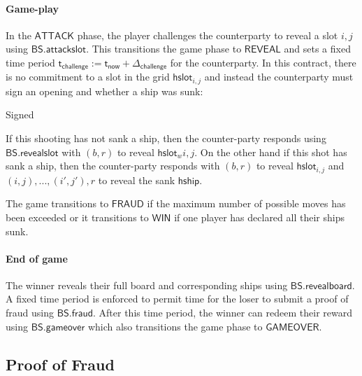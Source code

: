 \documentclass{llncs}
\newcommand{\instantiatedno}{\mathsf{NO}}
\newcommand{\instantiatedyes}{\mathsf{YES}}
\newcommand{\gameattack}{\mathsf{ATTACK}}
\newcommand{\gamereveal}{\mathsf{REVEAL}}
\newcommand{\gamewinner}{\mathsf{WIN}}
\newcommand{\gamefraud}{\mathsf{FRAUD}}
\newcommand{\gamefinished}{\mathsf{GAMEOVER}}
\newcommand{\hslot}{\mathsf{hslot}}
\newcommand{\hship}{\mathsf{hship}}
\newcommand{\hshiplocation}{\mathsf{hshiplocation}}
\newcommand{\participant}{\mathcal{P}}
\newcommand{\sign}{\mathsf{Sign}}
\newcommand{\battleshipfraud}{\mathsf{BS.fraud}}
\newcommand{\battleshipattackslot}{\mathsf{BS.attackslot}}
\newcommand{\battleshiprevealslot}{\mathsf{BS.revealslot}}
\newcommand{\battleshiprevealboard}{\mathsf{BS.revealboard}}
\newcommand{\battleshipgameover}{\mathsf{BS.gameover}}
\newcommand{\appcontract}{\mathsf{AC}}
\newcommand{\timerchallenge}{\mathsf{\Delta}_{\mathsf{challenge}}}
\newcommand{\timechallenge}{\mathsf{t}_{\mathsf{challenge}}}
\newcommand{\timenow}{\mathsf{t}_{\mathsf{now}}}
\begin{document}
\paragraph{Game-play} \label{sec:gameplay}

In the $\gameattack$ phase, the player challenges the counterparty to reveal a slot $i,j$ using $\battleshipattackslot$.
This transitions the game phase to $\gamereveal$ and sets a fixed time period $\timechallenge := \timenow + \timerchallenge$ for the counterparty.
In this contract, there is no commitment to a slot in the grid $\hslot_{i,j}$ and instead the counterparty must sign an opening and whether a ship was sunk: 

\begin{center}
	Signed
\end{center}

If this shooting has not sank a ship, then the counter-party responds using $\battleshiprevealslot$ with $(b,r)$ to reveal $\hslot_w{i,j}$. 
On the other hand if this shot has sank a ship, then the counter-party responds with $(b,r)$ to reveal $\hslot_{i,j}$ and $(i,j),...,(i',j'),r$ to reveal the sank $\hship$. 

The game transitions to $\gamefraud$ if the maximum number of possible moves has been exceeded or it transitions to $\gamewinner$ if one player has declared all their ships sunk. 

\paragraph{End of game} 

The winner reveals their full board and corresponding ships using $\battleshiprevealboard$.
A fixed time period is enforced to permit time for the loser to submit a proof of fraud using $\battleshipfraud$.
After this time period, the winner can redeem their reward using $\battleshipgameover$ which also transitions the game phase to $\gamefinished$. 


\subsection{Proof of Fraud}
\end{document}
